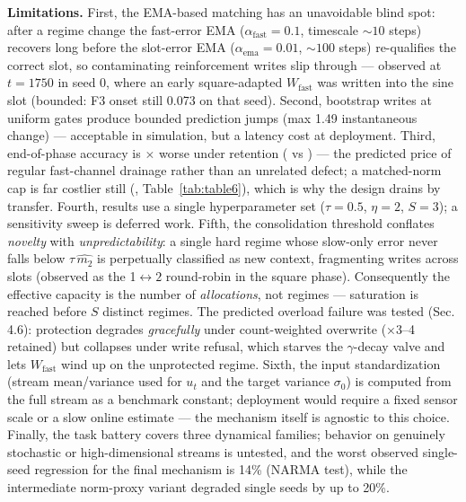 \documentclass[11pt]{article}
\begin{document}
\textbf{Limitations.} First, the EMA-based matching has an unavoidable
blind spot: after a regime change the fast-error EMA
(\(\alpha_{\mathrm{fast}}{=}0.1\), timescale \(\sim 10\) steps) recovers long
before the slot-error EMA (\(\alpha_{\mathrm{ema}}{=}0.01\), \(\sim 100\)
steps) re-qualifies the correct slot, so contaminating reinforcement
writes slip through --- observed at \(t{=}1750\) in seed 0, where an
early square-adapted \(W_{\mathrm{fast}}\) was written into the sine
slot (bounded: F3 onset still 0.073 on that seed). Second, bootstrap
writes at uniform gates produce bounded
prediction jumps (max 1.49 instantaneous change) --- acceptable in
simulation, but a latency cost at deployment. Third, end-of-phase
accuracy is \ctxEndPenalty\(\times\) worse under retention (\ctxEnd{} vs \blockEnd) --- the
predicted price of regular fast-channel drainage rather than an
unrelated defect; a matched-norm cap is far costlier still (\clampEnd,
Table~\ref{tab:table6}), which is why the design drains by transfer. Fourth, results use a single
hyperparameter set (\(\tau{=}0.5\), \(\eta{=}2\), \(S{=}3\)); a sensitivity sweep is
deferred work. Fifth, the consolidation threshold
conflates \emph{novelty} with \emph{unpredictability}: a single hard regime whose
slow-only error never falls below \(\tau\,\widehat{m_2}\) is perpetually
classified as new context, fragmenting writes across slots (observed as
the 1\(\leftrightarrow 2\) round-robin in the square phase). Consequently the effective
capacity is the number of \emph{allocations}, not regimes --- saturation is
reached before \(S\) distinct regimes. The predicted overload failure
was tested (Sec. 4.6): protection degrades \emph{gracefully} under
count-weighted overwrite (×3--4 retained) but collapses under write
refusal, which starves the \(\gamma\)-decay valve and lets
\(W_{\mathrm{fast}}\) wind up on the unprotected regime. Sixth, the input standardization (stream mean/variance used for
\(u_t\) and the target variance \(\sigma_0\)) is computed from the full
stream as a benchmark constant; deployment would require a fixed
sensor scale or a slow online estimate --- the mechanism itself is
agnostic to this choice. Finally, the task battery covers three
dynamical families; behavior on genuinely stochastic or
high-dimensional streams is untested, and the worst observed single-seed
regression for the final mechanism is 14\% (NARMA test), while the
intermediate norm-proxy variant degraded single seeds by up to 20\%.
\end{document}
